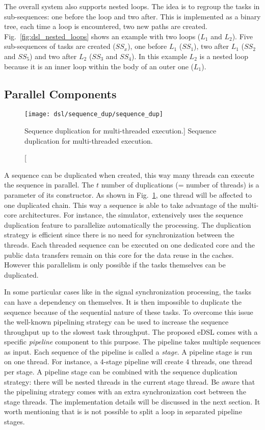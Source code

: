 The overall system also supports nested loops. The idea is to regroup the tasks
in sub-sequences: one before the loop and two after. This is implemented as a
binary tree, each time a loop is encountered, two new paths are created.
Fig.~\ref{fig:dsl_nested_loops} shows an example with two loops ($L_1$ and
$L_2$). Five sub-sequences of tasks are created ($SS_x$), one before $L_1$
($SS_1$), two after $L_1$ ($SS_2$ and $SS_5$) and two after $L_2$ ($SS_3$ and
$SS_4$). In this example $L_2$ is a nested loop because it is an inner loop
within the body of an outer one ($L_1$).

\subsection{Parallel Components}

\begin{figure}[htp]
  \centering
  \texttt{[image: dsl/sequence\_dup/sequence\_dup]}
  \caption
    [Sequence duplication for multi-threaded execution.]
    {Sequence duplication for multi-threaded execution.}
  \label{fig:dsl_sequence_dup}
\end{figure}

A sequence can be duplicated when created, this way many threads can execute the
sequence in parallel. The $t$ number of duplications (= number of threads) is a
parameter of its constructor. As shown in Fig.~\ref{fig:dsl_sequence_dup}, one
thread will be affected to one duplicated chain. This way a sequence is able to
take advantage of the multi-core architectures. For instance, the \AFFECT
simulator, extensively uses the sequence duplication feature to parallelize
automatically the processing. The duplication strategy is efficient since there
is no need for synchronization between the threads. Each threaded sequence can
be executed on one dedicated core and the public data transfers remain on this
core for the data reuse in the caches. However this parallelism is only possible
if the tasks themselves can be duplicated.

In some particular cases like in the signal synchronization processing, the
tasks can have a dependency on themselves. It is then impossible to duplicate
the sequence because of the sequential nature of these tasks. To overcome this
issue the well-known pipelining strategy can be used to increase the sequence
throughput up to the slowest task throughput. The proposed eDSL comes with a
specific \emph{pipeline} component to this purpose. The pipeline takes multiple
sequences as input. Each sequence of the pipeline is called a \emph{stage}. A
pipeline stage is run on one thread. For instance, a 4-stage pipeline will
create 4 threads, one thread per stage. A pipeline stage can be combined with
the sequence duplication strategy: there will be nested threads in the current
stage thread. Be aware that the pipelining strategy comes with an extra
synchronization cost between the stage threads. The implementation details will
be discussed in the next section. It worth mentioning that is is not possible to
split a loop in separated pipeline stages.

